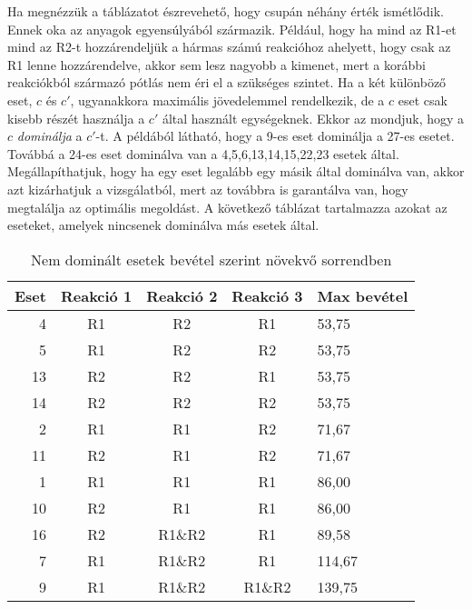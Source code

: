 Ha megnézzük a táblázatot észrevehető, hogy csupán néhány érték ismétlődik. Ennek oka az anyagok egyensúlyából származik. Például, hogy ha mind az R1-et mind az R2-t hozzárendeljük a hármas számú reakcióhoz ahelyett, hogy csak az R1 lenne hozzárendelve, akkor sem lesz nagyobb a kimenet, mert a korábbi reakciókból származó pótlás nem éri el a szükséges szintet. Ha a két különböző eset, $c$ és $c'$, ugyanakkora maximális jövedelemmel rendelkezik, de a $c$ eset csak kisebb részét használja a $c'$ által használt egységeknek. Ekkor az mondjuk, hogy a $c$ \textit{dominálja} a $c'$-t. A példából látható, hogy a 9-es eset dominálja a 27-es esetet. Továbbá a 24-es eset dominálva van a 4,5,6,13,14,15,22,23 esetek által. Megállapíthatjuk, hogy ha egy eset legalább egy másik által dominálva van, akkor azt kizárhatjuk a vizsgálatból, mert az továbbra is garantálva van, hogy megtalálja az optimális megoldást. A következő táblázat tartalmazza azokat az eseteket, amelyek nincsenek dominálva más esetek által. 	

\begin{table}[H]
	\begin{center}
		\caption{Nem dominált esetek bevétel szerint növekvő sorrendben}
		\captionsetup[table]{skip=10pt}		
		\begin{tabular}{r|ccc|l}
		Eset & Reakció 1 & Reakció 2 & Reakció 3 & Max bevétel  \\ 
		\hline
		4    & R1        & R2        & R1        & 53,75        \\
		5    & R1        & R2        & R2        & 53,75        \\
		13   & R2        & R2        & R1        & 53,75        \\
		14   & R2        & R2        & R2        & 53,75        \\
		2    & R1        & R1        & R2        & 71,67        \\
		11   & R2        & R1        & R2        & 71,67        \\
		1    & R1        & R1        & R1        & 86,00        \\
		10   & R2        & R1        & R1        & 86,00        \\
		16   & R2        & R1\&R2    & R1        & 89,58        \\
		7    & R1        & R1\&R2    & R1        & 114,67       \\
		9    & R1        & R1\&R2    & R1\&R2    & 139,75      
		\end{tabular}
	\end{center}
\end{table}

